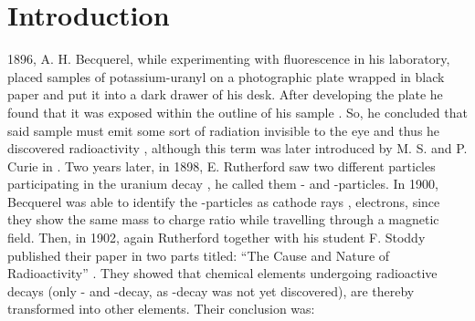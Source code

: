 \chapter{Introduction}
1896, A. H. Becquerel, while experimenting with fluorescence in his laboratory, placed samples of potassium-uranyl on a photographic plate wrapped in black paper and put it into a dark drawer of his desk. After developing the plate he found that it was exposed within the outline of his sample \cite{HistoryOfRadioactivity}. So, he concluded that said sample must emit some sort of radiation invisible to the eye and thus he discovered radioactivity \cite{Radioactivity}, although this term was later introduced by M. S. and P. Curie in \cite{NameRadioactivity}. Two years later, in 1898, E. Rutherford saw two different particles participating in the uranium decay \cite{BetaDecayDiscovery}, he called them \textalpha- and \textbeta-particles. In 1900, Becquerel was able to identify the \textbeta-particles as cathode rays \cite{BetaIsElectron}, \ie electrons, since they show the same mass to charge ratio while travelling through a magnetic field. Then, in 1902, again Rutherford together with his student F. Stoddy published their paper in two parts titled: ``The Cause and Nature of Radioactivity'' \cite{NatureOfRadioactivity1, NatureOfRadioactivity2}. They showed that chemical elements undergoing radioactive decays (only \textalpha- and \textbeta-decay, as \textgamma-decay was not yet discovered), are thereby transformed into other elements. Their conclusion was:\\

\cite[\textit{
    The results that have so far been obtained, which indicate that the velocity of this reaction is unaffected by the conditions, makes it clear that the changes in question are different in character from any that have been before dealt with in chemistry. It is apparent that we are dealing with phenomena outside the sphere of known atomic forces. Radioactivity may therefore be considered as a manifestation of subatomic chemical change.}
]{NatureOfRadioactivity1}\\

